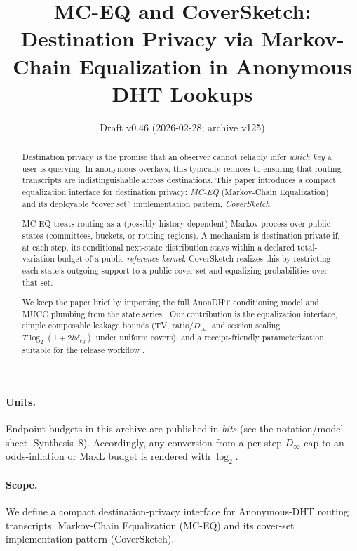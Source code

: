 \documentclass[11pt]{article}
\title{MC-EQ and CoverSketch:\\
Destination Privacy via Markov-Chain Equalization in Anonymous DHT Lookups}
\author{}
\date{Draft v0.46 (2026-02-28; archive v125)}
\begin{document}
\maketitle

\begin{abstract}
Destination privacy is the promise that an observer cannot reliably infer \emph{which key} a user is querying.
In anonymous overlays, this typically reduces to ensuring that routing transcripts are indistinguishable across destinations.
This paper introduces a compact equalization interface for destination privacy: \emph{MC-EQ} (Markov-Chain Equalization) and its deployable ``cover set'' implementation pattern, \emph{CoverSketch}.

MC-EQ treats routing as a (possibly history-dependent) Markov process over public states (committees, buckets, or routing regions).
A mechanism is destination-private if, at each step, its conditional next-state distribution stays within a declared total-variation budget of a public \emph{reference kernel}.
CoverSketch realizes this by restricting each state's outgoing support to a public cover set and equalizing probabilities over that set.

We keep the paper brief by importing the full AnonDHT conditioning model and MUCC plumbing from the state series \cite{series:state2}.
Our contribution is the equalization interface, simple composable leakage bounds (TV, ratio/$D_\infty$, and session scaling $T\log_2(1+2k\delta_{eq})$ under uniform covers), and a receipt-friendly parameterization suitable for the release workflow \cite{series:release}.
\end{abstract}

\paragraph{Units.}
Endpoint budgets in this archive are published in \emph{bits} (see the notation/model sheet, Synthesis~8).\cite{series:notation}
Accordingly, any conversion from a per-step $D_\infty$ cap to an odds-inflation or MaxL budget is rendered with $\log_2$.



\paragraph{Scope.}
We define a compact destination-privacy interface for Anonymous-DHT routing transcripts: Markov-Chain Equalization (MC-EQ) and its cover-set implementation pattern (CoverSketch).
\end{document}
